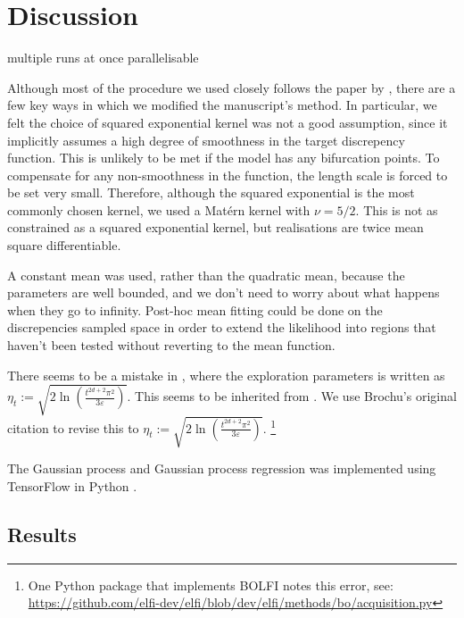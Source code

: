 \chapter{Discussion}

multiple runs at once parallelisable

Although most of the procedure we used closely follows the paper by
\cite{gutmann_bayesian_2016}, there are a few key ways in which we modified the
manuscript's method. In particular, we felt the choice of squared exponential
kernel was not a good assumption, since it implicitly assumes a high degree of
smoothness in the target discrepency function. This is unlikely to be met if
the model has any bifurcation points. To compensate for any non-smoothness in
the function, the length scale is forced to be set very small. Therefore,
although the squared exponential is the most commonly chosen kernel,
we used a Mat\'ern kernel with $\nu = 5/2$. This is not as constrained as a
squared exponential kernel, but realisations are twice mean square
differentiable.

A constant mean was used, rather than the quadratic mean, because the
parameters are well bounded, and we don't need to worry about what happens when
they go to infinity. Post-hoc mean fitting could be done on the discrepencies
sampled space in order to extend the likelihood into regions that haven't been
tested without reverting to the mean function.

There seems to be a mistake in \cite{gutmann_bayesian_2016}, where the
exploration parameters is written as
$\eta_t:= \sqrt{2\ln(\frac{t^{2d + 2}\pi^2}{3\varepsilon})}.$ This seems to be
inherited from \cite{brochu_tutorial_2010}. We use Brochu's original citation
\cite{srinivas_gaussian_2010} to revise this to
$\eta_t:= \sqrt{2\ln(\frac{t^{2d + 2}\pi^2}{3\varepsilon})}.$
\footnote{One Python package that implements BOLFI notes this error, see:
    \url{https://github.com/elfi-dev/elfi/blob/dev/elfi/methods/bo/acquisition.py}}

The Gaussian process and Gaussian process regression was implemented using
TensorFlow in Python \cite{abadi_tensorflow_2015}.

\section{Results}

